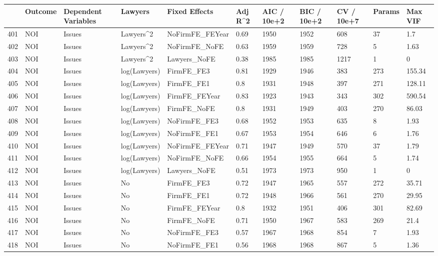 \documentclass{article}
\begin{document}
\begin{table}[H]
\centering
\begin{tabular}{rllllllllll}
  \hline
 & Outcome & Dependent Variables & Lawyers & Fixed Effects & Adj R^2 & AIC / 10e+2 & BIC / 10e+2 & CV / 10e+7 & Params & Max VIF \\ 
  \hline
401 & NOI & Issues & Lawyers^2 & NoFirmFE\_FEYear & 0.69 & 1950 & 1952 & 608 & 37 & 1.7 \\ 
  402 & NOI & Issues & Lawyers^2 & NoFirmFE\_NoFE & 0.63 & 1959 & 1959 & 728 & 5 & 1.63 \\ 
  403 & NOI & Issues & Lawyers^2 & Lawyers\_NoFE & 0.38 & 1985 & 1985 & 1217 & 1 & 0 \\ 
  404 & NOI & Issues & log(Lawyers) & FirmFE\_FE3 & 0.81 & 1929 & 1946 & 383 & 273 & 155.34 \\ 
  405 & NOI & Issues & log(Lawyers) & FirmFE\_FE1 & 0.8 & 1931 & 1948 & 397 & 271 & 128.11 \\ 
  406 & NOI & Issues & log(Lawyers) & FirmFE\_FEYear & 0.83 & 1923 & 1943 & 343 & 302 & 590.54 \\ 
  407 & NOI & Issues & log(Lawyers) & FirmFE\_NoFE & 0.8 & 1931 & 1949 & 403 & 270 & 86.03 \\ 
  408 & NOI & Issues & log(Lawyers) & NoFirmFE\_FE3 & 0.68 & 1952 & 1953 & 635 & 8 & 1.93 \\ 
  409 & NOI & Issues & log(Lawyers) & NoFirmFE\_FE1 & 0.67 & 1953 & 1954 & 646 & 6 & 1.76 \\ 
  410 & NOI & Issues & log(Lawyers) & NoFirmFE\_FEYear & 0.71 & 1947 & 1949 & 570 & 37 & 1.79 \\ 
  411 & NOI & Issues & log(Lawyers) & NoFirmFE\_NoFE & 0.66 & 1954 & 1955 & 664 & 5 & 1.74 \\ 
  412 & NOI & Issues & log(Lawyers) & Lawyers\_NoFE & 0.51 & 1973 & 1973 & 950 & 1 & 0 \\ 
  413 & NOI & Issues & No & FirmFE\_FE3 & 0.72 & 1947 & 1965 & 557 & 272 & 35.71 \\ 
  414 & NOI & Issues & No & FirmFE\_FE1 & 0.72 & 1948 & 1966 & 561 & 270 & 29.95 \\ 
  415 & NOI & Issues & No & FirmFE\_FEYear & 0.8 & 1932 & 1951 & 406 & 301 & 82.69 \\ 
  416 & NOI & Issues & No & FirmFE\_NoFE & 0.71 & 1950 & 1967 & 583 & 269 & 21.4 \\ 
  417 & NOI & Issues & No & NoFirmFE\_FE3 & 0.57 & 1967 & 1968 & 854 & 7 & 1.93 \\ 
  418 & NOI & Issues & No & NoFirmFE\_FE1 & 0.56 & 1968 & 1968 & 867 & 5 & 1.36 \\ 

\end{tabular}
\end{table}
\end{document}
